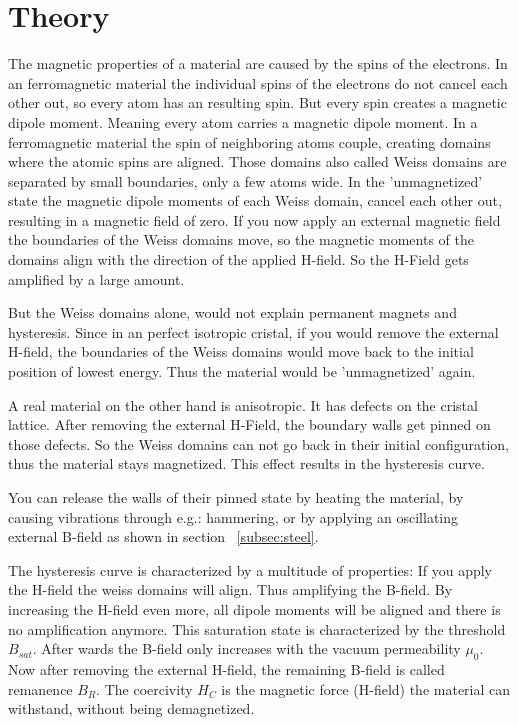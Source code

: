 \documentclass[a4paper,10pt,twocolumn]{article}
\begin{document}
    \section{Theory}
    \label{sec:Theory}
    
    The magnetic properties of a material are caused by the spins of the electrons.
    In an ferromagnetic material the individual spins of the electrons do not cancel each other out, so every atom has an
    resulting spin.
    But every spin creates a magnetic dipole moment.
    Meaning every atom carries a magnetic dipole moment.
    In a ferromagnetic material the spin of neighboring atoms couple,
    creating domains where the atomic spins are aligned. 
    Those domains also called Weiss domains are separated by small boundaries, only a few atoms wide.
    In the 'unmagnetized' state the magnetic dipole moments of each Weiss domain, cancel each other out, resulting in
    a magnetic field of zero.
    If you now apply an external magnetic field the boundaries of the Weiss domains move, so the magnetic moments of the
    domains align with the direction of the applied H-field.
    So the H-Field gets amplified by a large amount.
    
    But the Weiss domains alone, would not explain permanent magnets and hysteresis. 
    Since in an perfect isotropic cristal, if you would remove the external H-field, the boundaries of the Weiss domains
    would move back to the initial position of lowest energy. 
    Thus the material would be 'unmagnetized' again.
    
    A real material on the other hand is anisotropic.
    It has defects on the cristal lattice.
    After removing the external H-Field, the boundary walls get pinned on those defects.
    So the Weiss domains can not go back in their initial configuration, thus the material stays magnetized.
    This effect results in the hysteresis curve.
    
    You can release the walls of their pinned state by heating the material, by causing vibrations through e.g.: hammering,  
    or by applying an oscillating external B-field as shown in section ~\ref{subsec:steel}.
    
    The hysteresis curve is characterized by a multitude of properties:
    If you apply the H-field the weiss domains will align.
    Thus amplifying the B-field. 
    By increasing the H-field even more, all dipole moments will be aligned and there is no amplification anymore.
    This saturation state is characterized by the threshold $B_{sat}$.
    After wards the B-field only increases with the vacuum permeability $\mu_0$.
    Now after removing the external H-field, the remaining B-field is called remanence $B_{R}$.
    The coercivity $H_C$ is the magnetic force (H-field) the material can withstand, without being demagnetized.
    
\end{document}
